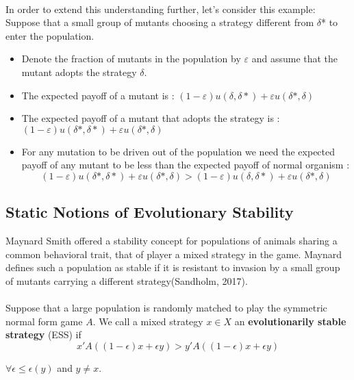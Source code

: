 \paragraph{}In order to extend this understanding further, let's consider this example:
Suppose that a small group of mutants choosing a strategy different from $\delta$* to enter the population.
\begin{itemize}
\item Denote the fraction of mutants in the population by $\varepsilon$ and assume that the mutant adopts the strategy $\delta$.
\item The expected payoff of a mutant is : 
	$(1-\varepsilon)u(\delta,\delta*)+\varepsilon u(\delta*,\delta)$
\item The expected payoff of a mutant that adopts the strategy is :	\\
	$(1-\varepsilon)u(\delta*,\delta*)+\varepsilon u(\delta*,\delta)$
	\item For any mutation to be driven out of the population we need the expected payoff of any mutant to be less than the expected payoff of normal organism :\\
	\begin{equation}(1-\varepsilon)u(\delta*,\delta*)+\varepsilon u(\delta*,\delta) > (1-\varepsilon)u(\delta,\delta*)+\varepsilon u(\delta*,\delta)  \end{equation}
\end{itemize}
\subsection{Static Notions of Evolutionary Stability}
Maynard Smith offered a stability concept for populations of animals sharing a common behavioral trait, that of player a mixed strategy in  the game. Maynard defines such a population as stable if it is resistant to invasion by a small group of mutants carrying a different strategy(Sandholm, 2017).
\paragraph{}Suppose that a large population is randomly matched to play the symmetric normal form game $A$. We call a mixed strategy $x \in X$ an \textbf{evolutionarily stable strategy} (ESS) if 
\begin{equation}\label{eq:55}
x' A((1 - \epsilon)x + \epsilon y) > y' A((1 - \epsilon)x + \epsilon y) 
\end{equation}
\begin{center}
$\forall \epsilon \leq \epsilon(y)$ and $y \neq x.$
\end{center}
